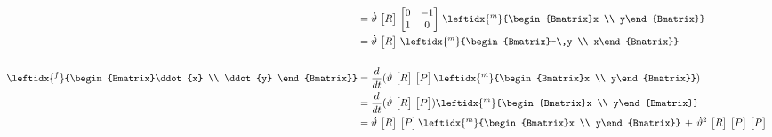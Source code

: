 \begin{itemize}
\begin{equation*}
\begin{split}
							 &=   \dot{\theta}\,\begin{bmatrix}R\end{bmatrix}\,
							 \begin{bmatrix}
									0 & -1\\
									1 & 0
								\end{bmatrix}\,
								 \leftidx{^m}{\begin{Bmatrix}x \\ y\end{Bmatrix}}\\
							&= \dot{\theta}\,\begin{bmatrix}R\end{bmatrix}\,  \leftidx{^m}{\begin{Bmatrix}-\,y \\ x\end{Bmatrix}}
							\\
							\\
							 \leftidx{^f}{\begin{Bmatrix}\ddot{x} \\ \ddot{y} \end{Bmatrix}} &= \frac{d}{dt}( \dot{\theta}\,\begin{bmatrix}R\end{bmatrix}\, \begin{bmatrix}P\end{bmatrix}\leftidx{^m}{\begin{Bmatrix}x \\ y\end{Bmatrix}})\\
							&= \frac{d}{dt}( \dot{\theta}\,\begin{bmatrix}R\end{bmatrix}\, \begin{bmatrix}P\end{bmatrix})\leftidx{^m}{\begin{Bmatrix}x \\ y\end{Bmatrix}}\\
							&= \ddot{\theta}\,\begin{bmatrix}R\end{bmatrix}\, \begin{bmatrix}P\end{bmatrix}
							\leftidx{^m}{\begin{Bmatrix}x \\ y\end{Bmatrix}}
							\,+\,\dot{\theta}^2\,\begin{bmatrix}R\end{bmatrix}\, \begin{bmatrix}P\end{bmatrix}\,\begin{bmatrix}P\end{bmatrix}\,

\end{split}
\end{equation*}
\end{itemize}
